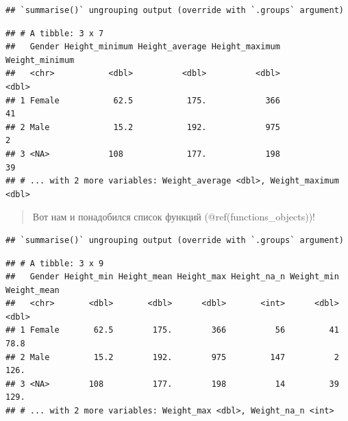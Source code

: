 \documentclass[
]{book}
\newenvironment{Shaded}{\begin{snugshade}}{\end{snugshade}}
\newcommand{\ControlFlowTok}[1]{\textcolor[rgb]{0.13,0.29,0.53}{\textbf{#1}}}
\newcommand{\DataTypeTok}[1]{\textcolor[rgb]{0.13,0.29,0.53}{#1}}
\newcommand{\KeywordTok}[1]{\textcolor[rgb]{0.13,0.29,0.53}{\textbf{#1}}}
\newcommand{\NormalTok}[1]{#1}
\newcommand{\OperatorTok}[1]{\textcolor[rgb]{0.81,0.36,0.00}{\textbf{#1}}}
\newcommand{\OtherTok}[1]{\textcolor[rgb]{0.56,0.35,0.01}{#1}}
\newcommand{\StringTok}[1]{\textcolor[rgb]{0.31,0.60,0.02}{#1}}
\begin{document}
\begin{verbatim}
## `summarise()` ungrouping output (override with `.groups` argument)
\end{verbatim}

\begin{verbatim}
## # A tibble: 3 x 7
##   Gender Height_minimum Height_average Height_maximum Weight_minimum
##   <chr>           <dbl>          <dbl>          <dbl>          <dbl>
## 1 Female           62.5           175.            366             41
## 2 Male             15.2           192.            975              2
## 3 <NA>            108             177.            198             39
## # ... with 2 more variables: Weight_average <dbl>, Weight_maximum <dbl>
\end{verbatim}

\begin{quote}
Вот нам и понадобился список функций (@ref(functions\_objects))!
\end{quote}

\begin{Shaded}
\end{Shaded}

\begin{verbatim}
## `summarise()` ungrouping output (override with `.groups` argument)
\end{verbatim}

\begin{verbatim}
## # A tibble: 3 x 9
##   Gender Height_min Height_mean Height_max Height_na_n Weight_min Weight_mean
##   <chr>       <dbl>       <dbl>      <dbl>       <int>      <dbl>       <dbl>
## 1 Female       62.5        175.        366          56         41        78.8
## 2 Male         15.2        192.        975         147          2       126. 
## 3 <NA>        108          177.        198          14         39       129. 
## # ... with 2 more variables: Weight_max <dbl>, Weight_na_n <int>
\end{verbatim}
\end{document}
